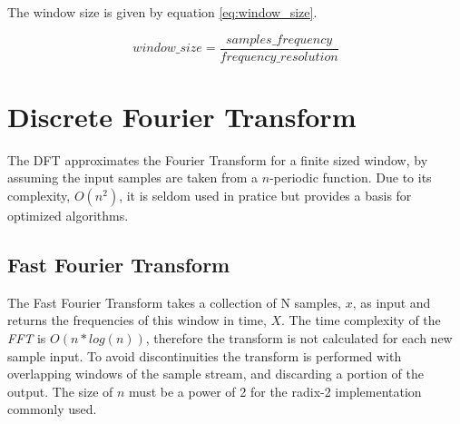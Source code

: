 The window size is given by equation \ref{eq:window_size}.


\begin{equation} \label{eq:window_size}
window\_size = \frac{samples\_frequency}{frequency\_resolution}	
\end{equation}



\section{Discrete Fourier Transform}\label{appendix:DFT}

The DFT approximates the Fourier Transform for a finite sized window, by assuming the 
input samples are taken from a $n$-periodic function. Due to its complexity, $O(n^2)$, 
it is seldom used in pratice but provides a basis for optimized algorithms. 

%
%			


\subsection{Fast Fourier Transform}\label{appendix:FFT}
The Fast Fourier Transform takes a collection of N samples, $x$, as input
and returns the frequencies of this window in time, $X$.
The time complexity of the {\it FFT} is $O(n*log(n))$, therefore the transform is not 
calculated for each new sample input. To avoid discontinuities the transform is performed 
with overlapping windows of the sample stream, and discarding a portion of the output.
The size of $n$ must be a power of 2 for the radix-2 implementation commonly used.

